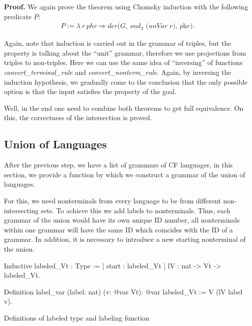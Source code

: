 \textbf{Proof.} 
We again prove the theorem using Chomsky induction with the following predicate $P$:
\begin{align*}
P :=  \lambda \ r \ phr \Rightarrow \textit{der(G, $snd_3$ (unVar r), phr)}.
\end{align*}

Again, note that induction is carried out in the grammar of triples, but the property is talking about the ``unit'' grammar, therefore we use projections from triples to non-triples.
Here we can use the same idea of ``inversing'' of functions \textit{convert\_terminal\_rule} and \textit{convert\_nonterm\_rule}.
Again, by inversing the induction hypothesis, we gradually come to the conclusion that the only possible option is that the input satisfies the property of the goal. 

 


Well, in the end one need to combine both theorems to get full equivalence. On this, the correctness of the intersection is proved.

\subsection{Union of Languages}

After the previous step, we have a list of grammars of CF languages, in this section, we provide a function by which we construct a grammar of the union of languages.

For this, we need nonterminals from every language to be from different non-intersecting sets. To achieve this we add labels to nonterminals. Thus, each grammar of the union would have its own unique ID number, all nonterminals within one grammar will have the same ID which coincides with the ID of a grammar. In addition, it is necessary to introduce a new starting nonterminal of the union.

\begin{listing}[h]
    \begin{pyglist}[language=coq, numbers=none, numbersep=5pt]
  Inductive labeled_Vt : Type :=
  | start : labeled_Vt
  | lV : nat -> Vt -> labeled_Vt.
  
  Definition label_var (label: nat) 
                       (v: @var Vt): @var 
                       labeled_Vt :=
    V (lV label v).  
    \end{pyglist}
    \caption{Definitions of labeled type and labeling function}
    \label{lst:verbments1}
\end{listing}

